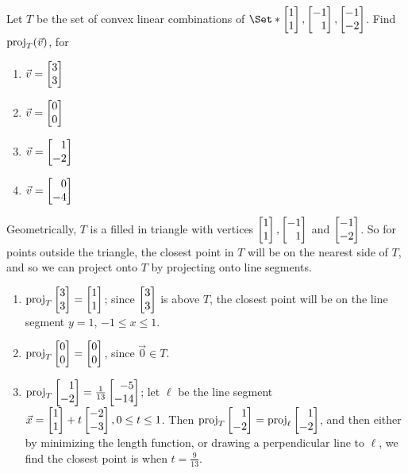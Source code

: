 \begin{exercises}
\begin{problist}
		\prob Let $T$ be the set of convex linear combinations of
		$\Set*{\mat{1\\1}, \mat{-1\\1},\mat{-1\\-2}}$. Find $\operatorname{proj}_{T}(\vec
		v)$, for
		\begin{enumerate}
			\item $\vec v = \mat{3\\3}$

			\item $\vec v = \mat{0\\0}$

			\item $\vec v = \mat{1\\-2}$

			\item $\vec v = \mat{0\\-4}$
		\end{enumerate}
		\begin{solution}
			Geometrically, $T$ is a filled in triangle with vertices
			$\mat{1\\1}, \mat{-1\\1}$ and $\mat{-1\\-2}$. So for points
			outside the triangle, the closest point in $T$ will be on
			the nearest side of $T$, and so we can project onto $T$
			by projecting onto line segments.


			\begin{enumerate}
				\item $\Proj_{T} \mat{3\\3}= \mat{1\\1}$; since
					$\mat{3\\3}$ is above $T$, the closest point
					will be on the line segment $y=1$,
					$-1\leq x \leq 1$.

				\item $\Proj_{T} \mat{0\\0}= \mat{0\\0}$, since
					$\vec 0\in T$.

				\item $\Proj_{T} \mat{1\\-2}= \frac{1}{13}\mat{-5\\-14}$;
					let $\ell$ be the line segment
					$\vec x= \mat{1\\1}+t\mat{-2\\-3}, 0\leq
					t \leq 1$. Then $\Proj_{T} \mat{1\\-2}= \Proj_{\ell}
					\mat{1\\-2}$, and then either by
					minimizing the length function, or
					drawing a perpendicular line to $\ell$, we
					find the closest point is when $t=\frac{9}{13}$.


\end{enumerate}
\end{solution}
\end{problist}
\end{exercises}
